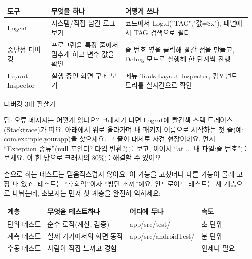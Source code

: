 


\begin{center}
\begin{tabularx}{\linewidth}{|X|X|X|}
\hline
\textbf{도구} & \textbf{무엇을 하나} & \textbf{어떻게 쓰나} \tabularnewline
\hline
Logcat & 시스템/직접 남긴 로그 보기 & 코드에서 Log.d("TAG","값=\$x"), 패널에서 TAG 검색으로 필터 \tabularnewline
중단점 디버깅 & 프로그램을 특정 줄에서 멈추게 하고 변수 값을 확인 & 줄 번호 옆을 클릭해 빨간 점을 만들고, Debug 모드로 실행해 한 단계씩 진행 \tabularnewline
Layout Inspector & 실행 중인 화면 구조 보기 & 메뉴 Tools Layout Inspector, 컴포넌트 트리를 실시간으로 확인 \tabularnewline
\hline
\end{tabularx}
\end{center}

\begin{center}\small\color{gray}디버깅 3대 필살기\end{center}

\begin{tcbinfo}{팁: 오류 메시지는 어떻게 읽나요?}
크래시가 나면 Logcat에 빨간색 스택 트레이스(Stacktrace)가 떠요. 아래에서 위로 올라가며 내 패키지 이름으로 시작하는 첫 줄(예: com.example.yourapp)을 찾으세요. 그 줄이 대체로 사건 현장이에요. 먼저 “Exception 종류”(null 포인터? 타입 변환?)를 보고, 이어서 “at ... 내 파일:줄 번호”를 보세요. 이 한 방으로 크래시의 80\%를 해결할 수 있어요.

\end{tcbinfo}


손으로 하는 테스트는 믿음직스럽지 않아요. 이 기능을 고쳤더니 다른 기능이 몰래 고장 나 있죠. 테스트는 “후회약”이자 “방탄 조끼”예요. 안드로이드 테스트는 세 계층으로 나뉘는데, 초보자는 먼저 첫 계층을 완전히 익히세요:

\begin{center}
\begin{tabularx}{\linewidth}{|X|X|X|X|}
\hline
\textbf{계층} & \textbf{무엇을 테스트하나} & \textbf{어디에 두나} & \textbf{속도} \tabularnewline
\hline
단위 테스트 & 순수 로직(계산, 검증) & app/src/test/ & 초 단위 \tabularnewline
계측 테스트 & 실제 기기에서의 화면 동작 & app/src/androidTest/ & 분 단위 \tabularnewline
수동 테스트 & 사람이 직접 느끼고 경험 & —— & 언제나 필요 \tabularnewline
\hline
\end{tabularx}
\end{center}

